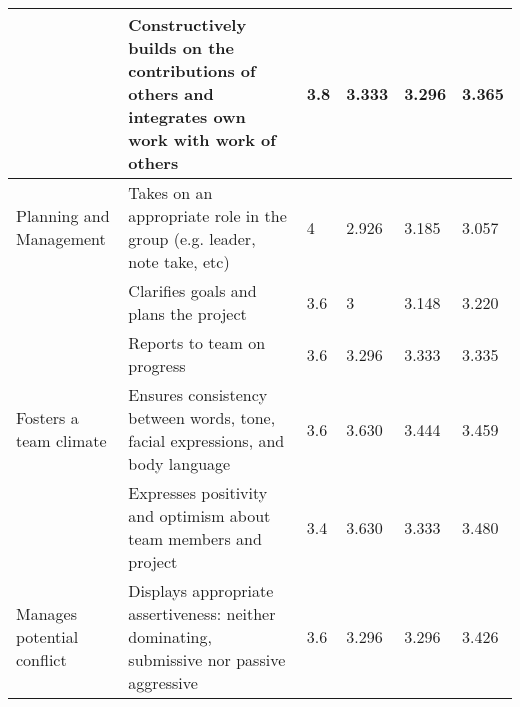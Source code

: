 \documentclass[sigconf, anonymous=true]{acmart}
\begin{document}
\begin{table*}[ht]
\begin{tabular} {| p{3cm} | p{8cm} | p{1cm}| p{1cm} | p{1cm}| p{1cm} |}
\hline
                                    & Constructively builds on the contributions of others and integrates own work with work of others & 3.8                                                     & 3.333                                                 & 3.296                                                 & 3.365                                               \\
\hline
Planning and Management             & Takes on an appropriate role in the group (e.g. leader, note take, etc)                          & 4                                                       & 2.926                                                 & 3.185                                                 & 3.057                                               \\
\hline
                                    & Clarifies goals and plans the project                                                            & 3.6                                                     & 3                                                     & 3.148                                                 & 3.220                                               \\
\hline
                                    & Reports to team on progress                                                                      & 3.6                                                     & 3.296                                                 & 3.333                                                 & 3.335                                               \\
\hline
Fosters a team climate              & Ensures consistency between words, tone, facial expressions, and body language                   & 3.6                                                     & 3.630                                                 & 3.444                                                 & 3.459                                               \\
\hline
                                    & Expresses positivity and optimism about team members and project                                 & 3.4                                                     & 3.630                                                 & 3.333                                                 & 3.480                                               \\
\hline
Manages potential conflict          & Displays appropriate assertiveness: neither dominating, submissive nor passive aggressive        & 3.6                                                     & 3.296                                                 & 3.296                                                 & 3.426                                               \\

\end{tabular}
\end{table*}
\end{document}
